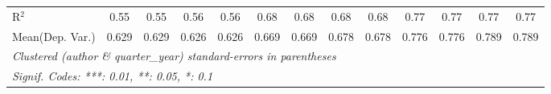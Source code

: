 \begin{tabular}{lcccccccccccc}
   R$^2$                                    & 0.55         & 0.55     & 0.56         & 0.56     & 0.68         & 0.68     & 0.68        & 0.68     & 0.77    & 0.77    & 0.77    & 0.77\\  
Mean(Dep. Var.) & 0.629 & 0.629 & 0.626 & 0.626 & 0.669 & 0.669 & 0.678 & 0.678 & 0.776 & 0.776 & 0.789 & 0.789 \\
   \midrule \midrule
   \multicolumn{13}{l}{\emph{Clustered (author \& quarter\_year) standard-errors in parentheses}}\\
   \multicolumn{13}{l}{\emph{Signif. Codes: ***: 0.01, **: 0.05, *: 0.1}}\\
\end{tabular}
\par\endgroup
